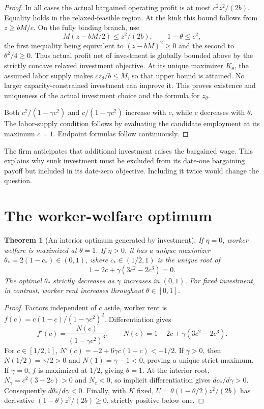 \documentclass[11pt,a4paper]{article}
\newtheorem{theorem}{Theorem}[section]
\theoremstyle{remark}
\begin{document}
\begin{proof}
In all cases the actual bargained operating profit is at most $c^2z^2/(2b)$. Equality holds in the relaxed-feasible region. At the kink this bound follows from $z\ge bM/c$. On the fully binding branch, use
\[
 M(z-bM/2)\le z^2/(2b),\qquad
 1-\theta\le c^2,
\]
the first inequality being equivalent to $(z-bM)^2\ge0$ and the second to $\theta^2/4\ge0$. Thus actual profit net of investment is globally bounded above by the strictly concave relaxed investment objective. At its unique maximizer $K_\theta$, the assumed labor supply makes $cz_\theta/b\le M$, so that upper bound is attained. No larger capacity-constrained investment can improve it. This proves existence and uniqueness of the actual investment choice and the formula for $z_\theta$.

Both $c^2/(1-\gamma c^2)$ and $c/(1-\gamma c^2)$ increase with $c$, while $c$ decreases with $\theta$. The labor-supply condition follows by evaluating the candidate employment at its maximum $c=1$. Endpoint formulas follow continuously.
\end{proof}
The firm anticipates that additional investment raises the bargained wage. This explains why sunk investment must be excluded from its date-one bargaining payoff but included in its date-zero objective. Including it twice would change the question.

\section{The worker-welfare optimum}
\begin{theorem}[An interior optimum generated by investment]
If $\eta=0$, worker welfare is maximized at $\theta=1$. If $\eta>0$, it has a unique maximizer $\theta_*=2(1-c_*)\in(0,1)$, where $c_*\in(1/2,1)$ is the unique root of
\[
 1-2c+\gamma(3c^2-2c^3)=0.
\]
The optimal $\theta_*$ strictly decreases as $\gamma$ increases in $(0,1)$. For fixed investment, in contrast, worker rent increases throughout $\theta\in[0,1]$.
\end{theorem}
\begin{proof}
Factors independent of $c$ aside, worker rent is
$f(c)=c(1-c)/(1-\gamma c^2)^2$. Differentiation gives
\[
 f'(c)=\frac{N(c)}{(1-\gamma c^2)^3},\qquad
 N(c)=1-2c+\gamma(3c^2-2c^3).
\]
For $c\in[1/2,1]$, $N'(c)=-2+6\gamma c(1-c)<-1/2$. If $\gamma>0$, then $N(1/2)=\gamma/2>0$ and $N(1)=\gamma-1<0$, proving a unique strict maximum. If $\gamma=0$, $f$ is maximized at $1/2$, giving $\theta=1$. At the interior root, $N_\gamma=c^2(3-2c)>0$ and $N_c<0$, so implicit differentiation gives $dc_*/d\gamma>0$. Consequently $d\theta_*/d\gamma<0$. Finally, with $K$ fixed, $U=\theta(1-\theta/2)z^2/(2b)$ has derivative $(1-\theta)z^2/(2b)\ge0$, strictly positive below one.
\end{proof}
\end{document}
